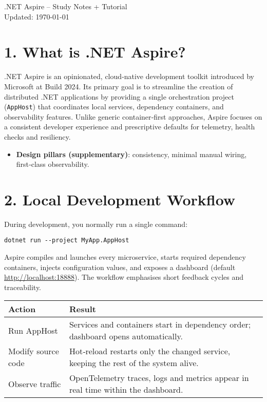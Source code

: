 \documentclass[table]{article}
\begin{document}
\begin{center}
  {\LARGE\color{pblue}\faCubes\enspace .NET Aspire – Study Notes + Tutorial}\\[2pt]
  {\footnotesize Updated: \today}
\end{center}
\vspace{1em}

\section*{1. \faLightbulb\enspace What is .NET Aspire?}
.NET Aspire is an opinionated, cloud‑native development toolkit introduced by Microsoft at Build 2024.  
Its primary goal is to streamline the creation of distributed .NET applications by providing a single orchestration project (\texttt{AppHost}) that coordinates local services, dependency containers, and observability features.  Unlike generic container‑first approaches, Aspire focuses on a consistent developer experience and prescriptive defaults for telemetry, health checks and resiliency.

\begin{itemize}
  \item \textbf{Design pillars (supplementary)}: consistency, minimal manual wiring, first‑class observability.
\end{itemize}

\section*{2. \faLaptopCode\enspace Local Development Workflow}
During development, you normally run a single command:
\begin{verbatim}
dotnet run --project MyApp.AppHost
\end{verbatim}
\noindent Aspire compiles and launches every microservice, starts required dependency containers, injects configuration values, and exposes a dashboard (default \url{http://localhost:18888}).  The workflow emphasises short feedback cycles and traceability.

\begin{tabularx}{\linewidth}{@{}>{\raggedright\arraybackslash}X>{\raggedright\arraybackslash}X@{}}
\toprule
Action & Result \\\midrule
Run AppHost & Services and containers start in dependency order; dashboard opens automatically.\\
Modify source code & Hot‑reload restarts only the changed service, keeping the rest of the system alive.\\
Observe traffic & OpenTelemetry traces, logs and metrics appear in real time within the dashboard.\\
\bottomrule
\end{tabularx}
\end{document}
